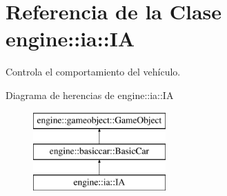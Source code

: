 \hypertarget{classengine_1_1ia_1_1IA}{
\section{\-Referencia de la \-Clase engine\-:\-:ia\-:\-:\-I\-A}
\label{classengine_1_1ia_1_1IA}
}


\-Controla el comportamiento del vehículo.  


\-Diagrama de herencias de engine\-:\-:ia\-:\-:\-I\-A\begin{figure}[H]
\begin{center}
\leavevmode
\includegraphics[height=3.000000cm]{classengine_1_1ia_1_1IA}
\end{center}
\end{figure}
